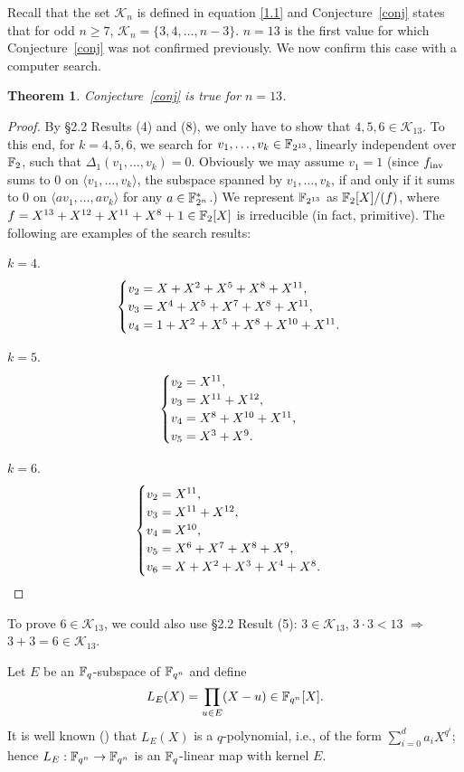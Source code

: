\documentclass{amsart}
\newtheorem{thm}{Theorem}[section]
\numberwithin{equation}{section}
\theoremstyle{definition}
\newcommand{\f}{\Bbb F}
\newcommand{\fin}{f_{\text{\rm inv}}}
\begin{document}
Recall that the set $\mathcal K_n$ is defined in equation \eqref{1.1} and Conjecture~\ref{conj} states that for odd $n\ge 7$, $\mathcal K_n=\{3,4,\dots,n-3\}$. $n=13$ is the first value for which Conjecture~\ref{conj} was not confirmed previously. We now confirm this case with a computer search.

\begin{thm}\label{n=13}
Conjecture~\ref{conj} is true for $n=13$.
\end{thm}

\begin{proof}
By \S2.2 Results (4) and (8), 
we only have to show that $4,5,6\in\mathcal K_{13}$. To this end, for $k=4,5,6$, we search for $v_1,\dots,v_k\in\f_{2^{13}}$, linearly independent over $\f_2$, such that $\Delta_1(v_1,\dots,v_k)=0$. Obviously we may assume $v_1=1$ (since $\fin$ sums to $0$ on $\langle v_1,\dots,v_k\rangle$, the subspace spanned by $v_1,\dots,v_k$, if and only if it sums to $0$ on $\langle av_1,\dots,av_k\rangle$ for any $a\in\f_{2^n}^*$.) We represent $\f_{2^{13}}$ as $\f_2[X]/(f)$, where $f=X^{13}+X^{12}+X^{11}+X^8+1 \in\f_2[X]$ is irreducible (in fact, primitive). The following are examples of the search results:

\medskip
\noindent $k=4$.
\[
\begin{cases}
v_2=X + X^2 + X^5 + X^8 + X^{11},\cr 
v_3=X^4 + X^5 + X^7 + X^8 + X^{11},\cr 
v_4=1 + X^2 + X^5 + X^8 + X^{10} + X^{11}.
\end{cases}
\]

\medskip
\noindent $k=5$.
\[
\begin{cases}
v_2=X^{11},\cr 
v_3=X^{11} + X^{12},\cr 
v_4=X^8 + X^{10} + X^{11},\cr 
v_5=X^3 + X^9.
\end{cases}
\]

\medskip
\noindent $k=6$.
\[
\begin{cases}
v_2=X^{11},\cr 
v_3=X^{11} + X^{12},\cr 
v_4=X^{10},\cr 
v_5=X^6 + X^7 + X^8 + X^9,\cr 
v_6=X + X^2 + X^3 + X^4 + X^8.
\end{cases}
\]
\end{proof}

 To prove $6\in \mathcal K_{13}$, we could also use \S2.2 Result (5): $3\in\mathcal K_{13}$, $3\cdot 3<13$ $\Rightarrow$ $3+3=6\in\mathcal K_{13}$.

\medskip
Let $E$ be an $\f_q$-subspace of $\f_{q^n}$ and define
\begin{equation}\label{LE}
L_E(X)=\prod_{u\in E}(X-u)\in\f_{q^n}[X].
\end{equation}
It is well known (\cite[Theorem~3.52]{Lidl-Niederreiter-FF-1997}) that $L_E(X)$ is a $q$-polynomial, i.e., of the form $\sum_{i=0}^da_iX^{q^i}$; hence $L_E:\f_{q^n}\to\f_{q^n}$ is an $\f_q$-linear map with kernel $E$. 
\end{document}
